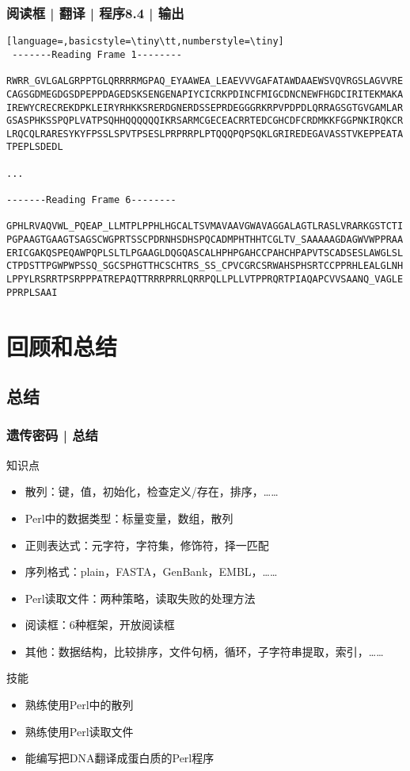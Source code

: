 \begin{frame}[fragile]
  \frametitle{阅读框 | 翻译 | 程序8.4 | 输出}
\begin{lstlisting}[language=,basicstyle=\tiny\tt,numberstyle=\tiny]
 -------Reading Frame 1--------

RWRR_GVLGALGRPPTGLQRRRRMGPAQ_EYAAWEA_LEAEVVVGAFATAWDAAEWSVQVRGSLAGVVRE
CAGSGDMEGDGSDPEPPDAGEDSKSENGENAPIYCICRKPDINCFMIGCDNCNEWFHGDCIRITEKMAKA
IREWYCRECREKDPKLEIRYRHKKSRERDGNERDSSEPRDEGGGRKRPVPDPDLQRRAGSGTGVGAMLAR
GSASPHKSSPQPLVATPSQHHQQQQQQIKRSARMCGECEACRRTEDCGHCDFCRDMKKFGGPNKIRQKCR
LRQCQLRARESYKYFPSSLSPVTPSESLPRPRRPLPTQQQPQPSQKLGRIREDEGAVASSTVKEPPEATA
TPEPLSDEDL

...

-------Reading Frame 6--------

GPHLRVAQVWL_PQEAP_LLMTPLPPHLHGCALTSVMAVAAVGWAVAGGALAGTLRASLVRARKGSTCTI
PGPAAGTGAAGTSAGSCWGPRTSSCPDRNHSDHSPQCADMPHTHHTCGLTV_SAAAAAGDAGWVWPPRAA
ERICGAKQSPEQAWPQPLSLTLPGAAGLDQGQASCALHPHPGAHCCPAHCHPAPVTSCADSESLAWGLSL
CTPDSTTPGWPWPSSQ_SGCSPHGTTHCSCHTRS_SS_CPVCGRCSRWAHSPHSRTCCPPRHLEALGLNH
LPPYLRSRRTPSRPPPATREPAQTTRRRPRRLQRRPQLLPLLVTPPRQRTPIAQAPCVVSAANQ_VAGLE
PPRPLSAAI
\end{lstlisting}
\end{frame}

\section{回顾和总结}
\subsection{总结}
\begin{frame}
  \frametitle{遗传密码 | 总结}
  \begin{block}{知识点}
    \begin{itemize}
      \item 散列：键，值，初始化，检查定义/存在，排序，……
      \item Perl中的数据类型：标量变量，数组，散列
      \item 正则表达式：元字符，字符集，修饰符，择一匹配
      \item 序列格式：plain，FASTA，GenBank，EMBL，……
      \item Perl读取文件：两种策略，读取失败的处理方法
      \item 阅读框：6种框架，开放阅读框
      \item 其他：数据结构，比较排序，文件句柄，循环，子字符串提取，索引，……
    \end{itemize}
  \end{block}
  \pause
  \begin{block}{技能}
    \begin{itemize}
      \item 熟练使用Perl中的散列
      \item 熟练使用Perl读取文件
      \item 能编写把DNA翻译成蛋白质的Perl程序
    \end{itemize}
  \end{block}
\end{frame}

